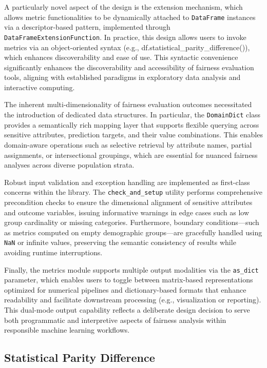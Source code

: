 \documentclass[12pt,a4paper,openright,twoside]{book}
\begin{document}
A particularly novel aspect of the design is the extension mechanism, which allows metric functionalities to be dynamically attached to \texttt{DataFrame} instances via a descriptor-based pattern, implemented through \texttt{DataFrameExtensionFunction}. In practice, this design allows users to invoke metrics via an object-oriented syntax (e.g., df.statistical\_parity\_difference()), which enhances discoverability and ease of use. This syntactic convenience significantly enhances the discoverability and accessibility of fairness evaluation tools, aligning with established paradigms in exploratory data analysis and interactive computing.

The inherent multi-dimensionality of fairness evaluation outcomes necessitated the introduction of dedicated data structures. In particular, the \texttt{DomainDict} class provides a semantically rich mapping layer that supports flexible querying across sensitive attributes, prediction targets, and their value combinations. This enables domain-aware operations such as selective retrieval by attribute names, partial assignments, or intersectional groupings, which are essential for nuanced fairness analyses across diverse population strata.

Robust input validation and exception handling are implemented as first-class concerns within the library. The \texttt{check\_and\_setup} utility performs comprehensive precondition checks to ensure the dimensional alignment of sensitive attributes and outcome variables, issuing informative warnings in edge cases such as low group cardinality or missing categories. Furthermore, boundary conditions—such as metrics computed on empty demographic groups—are gracefully handled using \texttt{NaN} or infinite values, preserving the semantic consistency of results while avoiding runtime interruptions.

Finally, the metrics module supports multiple output modalities via the \texttt{as\_dict} parameter, which enables users to toggle between matrix-based representations optimized for numerical pipelines and dictionary-based formats that enhance readability and facilitate downstream processing (e.g., visualization or reporting). This dual-mode output capability reflects a deliberate design decision to serve both programmatic and interpretive aspects of fairness analysis within responsible machine learning workflows.


\subsection{Statistical Parity Difference}
\end{document}
